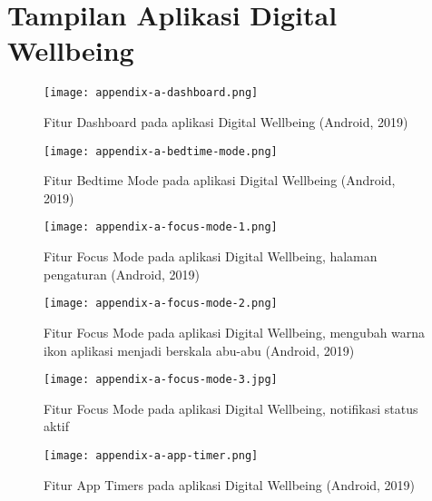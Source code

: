 \chapter{Tampilan Aplikasi Digital Wellbeing}
\label{chpt:gambar_dw}

\begin{figure}[h]
  \centering
  \texttt{[image: appendix-a-dashboard.png]}
  \caption{Fitur Dashboard pada aplikasi Digital Wellbeing (Android, 2019)}
\end{figure}

\begin{figure}[h]
  \centering
  \texttt{[image: appendix-a-bedtime-mode.png]}
  \caption{Fitur Bedtime Mode pada aplikasi Digital Wellbeing (Android, 2019)}
\end{figure}

\begin{figure}[h]
  \centering
  \texttt{[image: appendix-a-focus-mode-1.png]}
  \caption{Fitur Focus Mode pada aplikasi Digital Wellbeing, halaman pengaturan (Android, 2019)}
\end{figure}

\begin{figure}[h]
  \centering
  \texttt{[image: appendix-a-focus-mode-2.png]}
  \caption{Fitur Focus Mode pada aplikasi Digital Wellbeing, mengubah warna ikon aplikasi menjadi berskala abu-abu (Android, 2019)}
\end{figure}

\begin{figure}[h]
  \centering
  \texttt{[image: appendix-a-focus-mode-3.jpg]}
  \caption{Fitur Focus Mode pada aplikasi Digital Wellbeing, notifikasi status aktif}
\end{figure}

\begin{figure}[h]
  \centering
  \texttt{[image: appendix-a-app-timer.png]}
  \caption{Fitur App Timers pada aplikasi Digital Wellbeing (Android, 2019)}
\end{figure}
